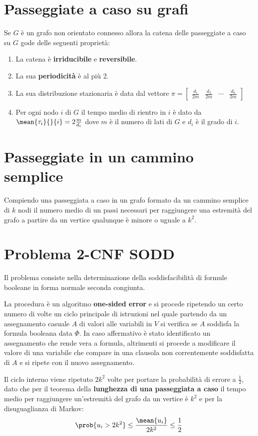 \documentclass[\main/main.tex]{subfiles}
\begin{document}
\section{Passeggiate a caso su grafi}
\begin{theorem}
  Se \(G\) è un grafo non orientato connesso allora la catena delle passeggiate a caso su \(G\) gode delle seguenti proprietà:
  \begin{enumerate}
    \item La catena è \textbf{irriducibile} e \textbf{reversibile}.
    \item La sua \textbf{periodicità} è al più 2.
    \item La sua distribuzione stazionaria è data dal vettore \(\pi = \begin{bmatrix}
            \frac{d_1}{2m} & \frac{d_2}{2m} & \cdots & \frac{d_k}{2m}
          \end{bmatrix}\)
    \item Per ogni nodo \(i\) di \(G\) il tempo medio di rientro in \(i\) è dato da \(\mean{\tau_i}{}{i} = 2\frac{m}{d_i}\) dove \(m\) è il numero di lati di \(G\) e \(d_i\) è il grado di \(i\).
  \end{enumerate}
\end{theorem}

\section{Passeggiate in un cammino semplice}
\begin{theorem}
  Compiendo una passeggiata a caso in un grafo formato da un cammino semplice di \(k\) nodi il numero medio di un passi necessari per raggiungere una estremità del grafo a partire da un vertice qualunque è minore o uguale a \(k^2\).
\end{theorem}

\section{Problema 2-CNF SODD}
Il problema consiste nella determinazione della soddisfacibilità di formule booleane in forma normale seconda congiunta.

La procedura è un algoritmo \textbf{one-sided error} e si procede ripetendo un certo numero di volte un ciclo principale di istruzioni nel quale  partendo da un assegnamento casuale \(A\) di valori alle variabili in \(V\) si verifica se \(A\) soddisfa la formula booleana data \(\Phi \). In caso affermativo è stato identificato un assegnamento che rende vera a formula, altrimenti si procede a modificare il valore di una variabile che compare in una clausola non correntemente soddisfatta di \(A\) e si ripete con il nuovo assegnamento.

Il ciclo interno viene ripetuto \(2k^2\) volte per portare la probabilità di errore a \(\frac{1}{2}\), dato che per il teorema della \textbf{lunghezza di una passeggiata a caso} il tempo medio per raggiungere un'estremità del grafo da un vertice è \(k^2\) e per la disuguaglianza di Markov:
\[
  \prob{u_i > 2k^2} \leq \frac{\mean{u_i}}{2k^2} \leq \frac{1}{2}
\]
\end{document}
